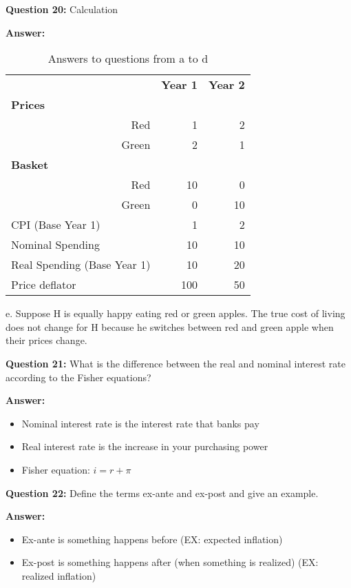 \documentclass[a4paper, 11pt]{article}
\begin{document}
\textbf{Question 20:} Calculation

\textbf{Answer:} 

\begin{table}[htbp]
  \centering
  \caption{Answers to questions from a to d}
    \begin{tabular}{lrr}
    \toprule
    \toprule
          & \multicolumn{1}{c}{\textbf{Year 1}} & \multicolumn{1}{c}{\textbf{Year 2}} \\
    \textbf{Prices} &       &  \\
    \multicolumn{1}{r}{Red} & 1     & 2 \\
    \multicolumn{1}{r}{Green} & 2     & 1 \\
    \textbf{Basket} &       &  \\
    \multicolumn{1}{r}{Red} & 10    & 0 \\
    \multicolumn{1}{r}{Green} & 0     & 10 \\
    \midrule
    CPI (Base Year 1) & 1     & 2 \\
    Nominal Spending & 10    & 10 \\
    Real Spending (Base Year 1) & 10    & 20 \\
    Price deflator & 100   & 50 \\
    \bottomrule
    \end{tabular}%
\end{table}%

\clearpage

e. Suppose H is equally happy eating red or green apples. The true cost of living does not change for H because he switches between red and green apple when their prices change.

\textbf{Question 21:} What is the difference between the real and nominal interest rate according to the Fisher equations?

\textbf{Answer:} 
\begin{itemize}
\item Nominal interest rate is the interest rate that banks pay
\item Real interest rate is the increase in your purchasing power
\item Fisher equation: $i = r + \pi$
\end{itemize}

\textbf{Question 22:} Define the terms ex-ante and ex-post and give an example.

\textbf{Answer:} 

\begin{itemize}
\item Ex-ante is something happens before (EX: expected inflation)
\item Ex-post is something happens after (when something is realized) (EX: realized inflation)
\end{itemize}
\end{document}
